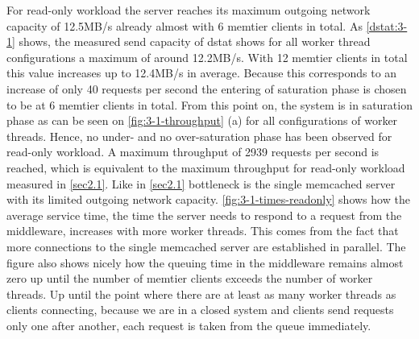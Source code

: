 \documentclass[11pt,a4paper]{article}
\begin{document}
For read-only workload the server reaches its maximum outgoing network capacity of 12.5MB/s already almost with 6 memtier clients in total. As \autoref{dstat:3-1} shows, the measured send capacity of dstat shows for all worker thread configurations a maximum of around 12.2MB/s. With 12 memtier clients in total this value increases up to 12.4MB/s in average. Because this corresponds to an increase of only 40 requests per second the entering of saturation phase is chosen to be at 6 memtier clients in total. From this point on, the system is in saturation phase as can be seen on \autoref{fig:3-1-throughput} (a) for all configurations of worker threads. Hence, no under- and no over-saturation phase has been observed for read-only workload.
A maximum throughput of 2939 requests per second is reached, which is equivalent to the maximum throughput for read-only workload measured in \autoref{sec2.1}.
Like in \autoref{sec2.1} bottleneck is the single memcached server with its limited outgoing network capacity.
\autoref{fig:3-1-times-readonly} shows how the average service time, the time the server needs to respond to a request from the middleware, increases with more worker threads. This comes from the fact that more connections to the single memcached server are established in parallel. The figure also shows nicely how the queuing time in the middleware remains almost zero up until the number of memtier clients exceeds the number of worker threads. Up until the point where there are at least as many worker threads as clients connecting, because we are in a closed system and clients send requests only one after another, each request is taken from the queue immediately.
\end{document}
